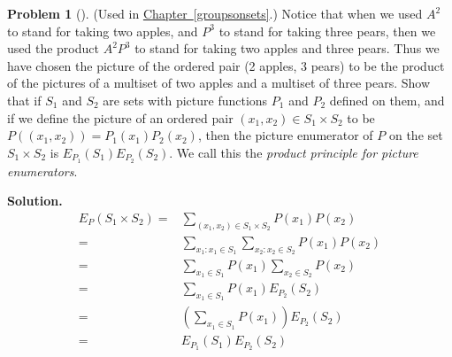 \documentclass[10pt,]{book}
\theoremstyle{plain}
\theoremstyle{definition}
\newtheorem{activity}[project]{Problem}
\theoremstyle{definition}
\numberwithin{equation}{chapter}
\newcommand{\amp}{&}
\begin{document}
\begin{activity}[]\label{activity-182}
(Used in \hyperref[groupsonsets]{Chapter~\ref{groupsonsets}}.) Notice that when we used \(A^2\) to stand for taking two apples, and \(P^3\) to stand for taking three pears, then we used the product \(A^2P^3\) to stand for taking two apples and three pears. Thus we have chosen the picture of the ordered pair (2 apples, 3 pears) to be the product of the pictures of a multiset of two apples and a multiset of three pears. Show that if \(S_1\) and \(S_2\) are sets with picture functions \(P_1\) and \(P_2\) defined on them, and if we define the picture of an ordered pair \((x_1,x_2)\in S_1\times S_2\) to be \(P((x_1,x_2))= P_1(x_1)P_2(x_2)\), then the picture enumerator of \(P\) on the set \(S_1\times S_2\) is \(E_{P_1}(S_1)E_{P_2}(S_2)\). We call this the \emph{product principle for picture enumerators}.%
\par\medskip\noindent%
\textbf{Solution.}\quad %
\begin{align*}
E_P(S_1\times S_2) =\amp \sum_{(x_1,x_2)\in S_1\times
S_2} P(x_1)P(x_2)\\
=\amp
\sum_{x_1:x_1\in S_1}\sum_{x_2:x_2\in S_2} P(x_1)P(x_2)\\
=\amp \sum_{x_1\in S_1}P(x_1)\sum_{x_2\in S_2}P(x_2)\\
=\amp \sum_{x_1\in S_1} P(x_1) E_{P_2}(S_2)\\
=\amp \left(\sum_{x_1\in S_1} P(x_1)\right)E_{P_2}(S_2)\\
=\amp E_{P_1}(S_1)E_{P_2}(S_2)
\end{align*}
%
\end{activity}
\typeout{************************************************}
\typeout{************************************************}
\end{document}

